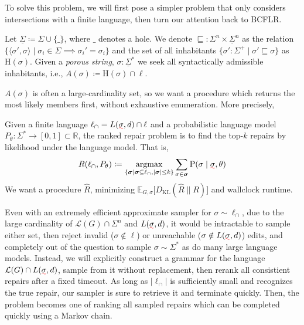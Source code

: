 \documentclass[sigplan,review,anonymous,acmsmall]{acmart}\settopmatter{printfolios=false,printccs=false,printacmref=false}
\begin{document}
  To solve this problem, we will first pose a simpler problem that only considers intersections with a finite language, then turn our attention back to BCFLR.

  \begin{definition}
    Let $\underline\Sigma \coloneqq \Sigma \cup \{\_\}$, where $\_$ denotes a hole. We denote $\sqsubseteq: \Sigma^n \times \underline\Sigma^n$ as the relation $\{\langle\sigma', \sigma\rangle \mid \sigma_i \in \Sigma \implies \sigma_i' = \sigma_i\}$ and the set of all inhabitants $\{\sigma': \Sigma^+ \mid \sigma' \sqsubseteq \sigma\}$ as $\text{H}(\sigma)$. Given a \textit{porous string}, $\sigma: \underline\Sigma^*$ we seek all syntactically admissible inhabitants, i.e., $A(\sigma)\coloneqq\text{H}(\sigma)\cap\ell$.
  \end{definition}

  $A(\sigma)$ is often a large-cardinality set, so we want a procedure which returns the most likely members first, without exhaustive enumeration. More precisely,

  \begin{definition}
    Given a finite language $\ell_\cap = L(\err\sigma, d) \cap \ell$ and a probabilistic language model $P_\theta: \Sigma^* \rightarrow [0, 1] \subset \mathbb{R}$, the ranked repair problem is to find the top-$k$ repairs by likelihood under the language model. That is,
    \begin{equation}
      R(\ell_\cap, P_\theta) \coloneqq \argmax_{\{\bm{\sigma} \mid \bm{\sigma} \subseteq \ell_\cap, |\bm{\sigma}| \leq k\}} \sum_{\sigma \in \bm{\sigma}}\text{P}(\sigma\mid\err\sigma, \theta)
    \end{equation}
    We want a procedure $\hat{R}$, minimizing $\mathbb{E}_{G, \sigma}\big[D_{\text{KL}}(\hat{R} \parallel R)\big]$ and wallclock runtime.
  \end{definition}

  Even with an extremely efficient approximate sampler for $\sigma \sim \ell_\cap$, due to the large cardinality of $\mathcal{L}(G)\cap\Sigma^n$ and $L(\err\sigma, d)$, it would be intractable to sample either set, then reject invalid ($\sigma \notin \ell$) or unreachable ($\sigma \notin L(\err\sigma, d)$) edits, and completely out of the question to sample $\sigma \sim \Sigma^*$ as do many large language models. Instead, we will explicitly construct a grammar for the language $\mathcal{L}(G) \cap L(\err\sigma, d)$, sample from it without replacement, then rerank all consistient repairs after a fixed timeout. As long as $|\ell_\cap|$ is sufficiently small and recognizes the true repair, our sampler is sure to retrieve it and terminate quickly. Then, the problem becomes one of ranking all sampled repairs which can be completed quickly using a Markov chain.
\end{document}
